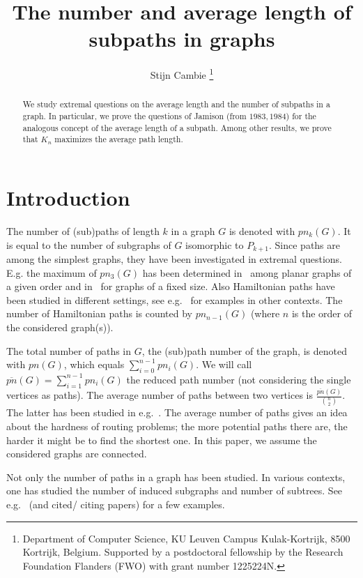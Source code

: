 \documentclass[a4paper,11pt]{article}
\title{The number and average length of subpaths in graphs}
\author{Stijn Cambie
 \thanks{Department of Computer Science, KU Leuven Campus Kulak-Kortrijk, 8500 Kortrijk, Belgium. Supported by a postdoctoral fellowship by the Research Foundation Flanders (FWO) with grant number 1225224N.} }%
\newcommand{\pn}{pn}
\begin{document}
\maketitle
\begin{abstract}
    We study extremal questions on the average length and the number of subpaths in a graph.
    In particular, we prove the questions of Jamison (from $1983, 1984$) for the analogous concept of the average length of a subpath. Among other results, we prove that $K_n$ maximizes the average path length.
\end{abstract}


\section{Introduction}
The number of (sub)paths of length $k$ in a graph $G$ is denoted with $\pn_k(G)$. It is equal to the number of subgraphs of $G$ isomorphic to $P_{k+1}.$
Since paths are among the simplest graphs, they have been investigated in extremal questions.
E.g. the maximum of $\pn_3(G)$ has been determined in~\cite{GGPSTZ22} among planar graphs of a given order
and in~\cite{Byer01} for graphs of a fixed size.
Also Hamiltonian paths have been studied in different settings, see e.g.~\cite{AAR01,CFMNRZ21} for examples in other contexts. The number of Hamiltonian paths is counted by $\pn_{n-1}(G)$ (where $n$ is the order of the considered graph(s)).

The total number of paths in $G$, the (sub)path number of the graph, is denoted with $\pn(G)$, which equals $\sum_{i=0}^{n-1} \pn_i(G).$
We will call $\overline{\pn}(G)=\sum_{i=1}^{n-1} \pn_i(G)$ the reduced path number (not considering the single vertices as paths).
The average number of paths between two vertices is $\frac{ \overline{\pn}(G)}{\binom n2}.$
The latter has been studied in e.g.~\cite{vM01}.
The average number of paths gives an idea about the hardness of routing problems; the more potential paths there are, the harder it might be to find the shortest one. In this paper, we assume the considered graphs are connected.

Not only the number of paths in a graph has been studied. In various contexts, one has studied the number of induced subgraphs and number of subtrees.
See e.g.~\cite{Matula70,SW05,CJG23} (and cited/ citing papers) for a few examples. 
\end{document}
